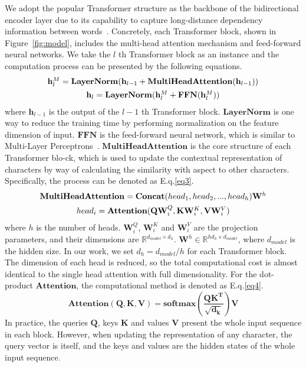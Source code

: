 We adopt the popular Transformer structure as the backbone of the bidirectional encoder layer due to its capability to capture long-distance dependency information between words~\cite{devlin-etal-2019-bert, debert, T5}. Concretely, each Transformer block, shown in Figure~\ref{fig:model}, includes the multi-head attention mechanism and feed-forward neural networks. We take the $l$ th Transformer block as an instance and the computation process can be presented by the following equations.
\begin{equation}
\begin{array}{c}
\mathbf{h}_{l}^{M}=\mathbf{LayerNorm}(\mathbf{h}_{l-1} + \mathbf{MultiHeadAttention}(\mathbf{h}_{l-1}))\vspace{1ex} \\
\mathbf{h}_{l} = \mathbf{LayerNorm}(\mathbf{h}_{l}^{M} + \mathbf{FFN}(\mathbf{h}_{l}^{M}))  
\end{array}
\label{eq2}
\end{equation} where $\mathbf{h}_{l-1}$ is the output of the $l-1$ th Transformer block. $\mathbf{LayerNorm}$ \cite{layernorm} is one way to reduce the training time by performing normalization on the feature dimension of input. $\mathbf{FFN}$ is the feed-forward neural network, which is similar to Multi-Layer Perceptrons~\cite{perceptron}. $\mathbf{MultiHeadAttention}$ is the core structure of each Transformer blo-ck, which is used to update the contextual representation of characters by way of calculating the similarity with aspect to other characters. Specifically, the process can be denoted as E.q.\ref{eq3}.
\begin{equation}
\begin{array}{c}
    \mathbf{MultiHeadAttention} = \mathbf{Concat}(head_1, head_2, ..., head_h)\mathbf{W}^{h}\vspace{1ex} \\
    head_i = \mathbf{Attention}(\mathbf{Q}\mathbf{W}_{i}^{Q}, \mathbf{K}\mathbf{W}_{i}^{K}, \mathbf{V}\mathbf{W}_{i}^{V})
\end{array}    
\label{eq3}
\end{equation} where $h$ is the number of heads. $\mathbf{W}_{i}^{Q}$, $\mathbf{W}_{i}^{K}$ and $\mathbf{W}_{i}^{V}$ are the projection parameters, and their dimensions are $\mathbb{R}^{d_{model}\times d_{h}}$. $\mathbf{W}^{h}\in \mathbb{R}^{h d_{h} \times d_{model}}$, where $d_{model}$ is the hidden size. In our work, we set $d_h = d_{model}/h$ for each Transformer block. The dimension of each head is reduced, so the total computational cost is almost identical to the single head attention with full dimensionality. For the dot-product $\mathbf{Attention}$, the computational method is denoted as E.q.\ref{eq4}.
\begin{equation}
    \mathbf{Attention(\mathbf{Q},\mathbf{K},\mathbf{V}) = \mathbf{softmax}(\frac{\mathbf{Q}\mathbf{K}^{T}}{\sqrt{d_{k}}})\mathbf{V}}
    \label{eq4}
\end{equation}
In practice, the queries $\mathbf{Q}$, keys $\mathbf{K}$ and values $\mathbf{V}$ present the whole input sequence in each block. However, when updating the representation of any character, the query vector is itself, and the keys and values are the hidden states of the whole input sequence.

